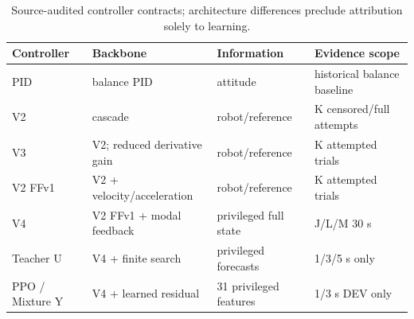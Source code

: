 \begin{table}[t]
\centering\small
\caption{Source-audited controller contracts; architecture differences preclude attribution solely to learning.}
\label{tab:controller}
\begin{tabular}{llll}
\hline
Controller & Backbone & Information & Evidence scope \\
\hline
PID & balance PID & attitude & historical balance baseline \\
V2 & cascade & robot/reference & K censored/full attempts \\
V3 & V2; reduced derivative gain & robot/reference & K attempted trials \\
V2 FFv1 & V2 + velocity/acceleration & robot/reference & K attempted trials \\
V4 & V2 FFv1 + modal feedback & privileged full state & J/L/M 30 s \\
Teacher U & V4 + finite search & privileged forecasts & 1/3/5 s only \\
PPO / Mixture Y & V4 + learned residual & 31 privileged features & 1/3 s DEV only \\
\hline
\end{tabular}
\end{table}

